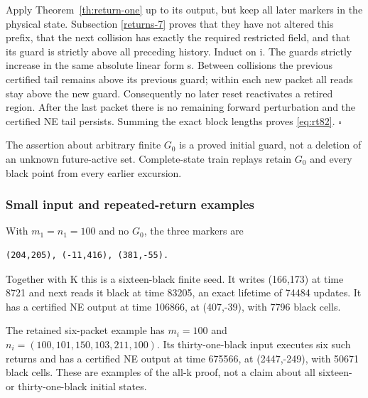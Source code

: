 Apply Theorem~\ref{th:return-one} up to its output, but keep all later markers in the
physical state. Subsection \ref{returns-7} proves that they have not
altered this prefix, that the next collision has exactly the required
restricted field, and that its guard is strictly above all preceding
history. Induct on i. The guards strictly increase in the same absolute
linear form s. Between collisions the previous certified tail remains
above its previous guard; within each new packet all reads stay above
the new guard. Consequently no later reset reactivates a retired region.
After the last packet there is no remaining forward perturbation and the
certified NE tail persists. Summing the exact block lengths proves
\eqref{eq:rt82}. \(\square\)

The assertion about arbitrary finite $G_0$ is a proved initial guard, not a
deletion of an unknown future-active set. Complete-state train replays
retain $G_0$ and every black point from every earlier excursion.

\subsubsection{Small input and repeated-return
examples}\label{small-input-and-repeated-return-examples}

With $m_1=n_1=100$ and no $G_0$, the three markers are

\begin{lstlisting}
(204,205), (-11,416), (381,-55).
\end{lstlisting}

Together with K this is a sixteen-black finite seed. It writes (166,173)
at time 8721 and next reads it black at time 83205, an exact lifetime of
74484 updates. It has a certified NE output at time 106866, at
(407,-39), with 7796 black cells.

The retained six-packet example has $m_i=100$ and
\(n_i=(100,101,150,103,211,100)\). Its thirty-one-black input executes six
such returns and has a certified NE output at time 675566, at
(2447,-249), with 50671 black cells. These are examples of the all-k
proof, not a claim about all sixteen- or thirty-one-black initial
states.
